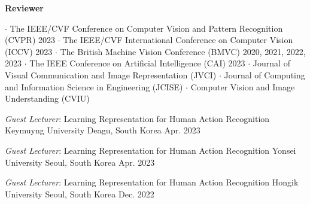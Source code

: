 


\vspace{-.5em}\textbf{Reviewer}
\begin{cvskills}
\cvskill
{} %
{\hspace{-3em} \textbf{$\cdot$} The IEEE/CVF Conference on Computer Vision and Pattern Recognition (CVPR) 2023}
\cvskill
{} %
{\hspace{-3em} \textbf{$\cdot$} The IEEE/CVF International Conference on Computer Vision (ICCV) 2023}
\cvskill
{} %
{\hspace{-3em} \textbf{$\cdot$} The British Machine Vision Conference (BMVC) 2020, 2021, 2022, 2023}
\cvskill
{} %
{\hspace{-3em} \textbf{$\cdot$} The IEEE Conference on Artificial Intelligence (CAI) 2023}
\cvskill
{} %
{\hspace{-3em} \textbf{$\cdot$} Journal of Visual Communication and Image Representation (JVCI)}
\cvskill
{}
{\hspace{-3em} \textbf{$\cdot$} Journal of Computing and Information Science in Engineering (JCISE)}
\cvskill
{}
{\hspace{-3em} \textbf{$\cdot$} Computer Vision and Image Understanding (CVIU)}


\end{cvskills}


\vspace{.5em}

\cventry
{\textit{Guest Lecturer}: Learning Representation for Human Action Recognition}
{Keymuyng University}
{Deagu, South Korea}
{Apr. 2023}
{}


\vspace{-1em}
\cventry
{\textit{Guest Lecturer}: Learning Representation for Human Action Recognition}
{Yonsei University}
{Seoul, South Korea}
{Apr. 2023}
{}

\vspace{-1em}
\cventry
{\textit{Guest Lecturer}: Learning Representation for Human Action Recognition}
{Hongik University}
{Seoul, South Korea}
{Dec. 2022}
{}
\vspace{-1em}

